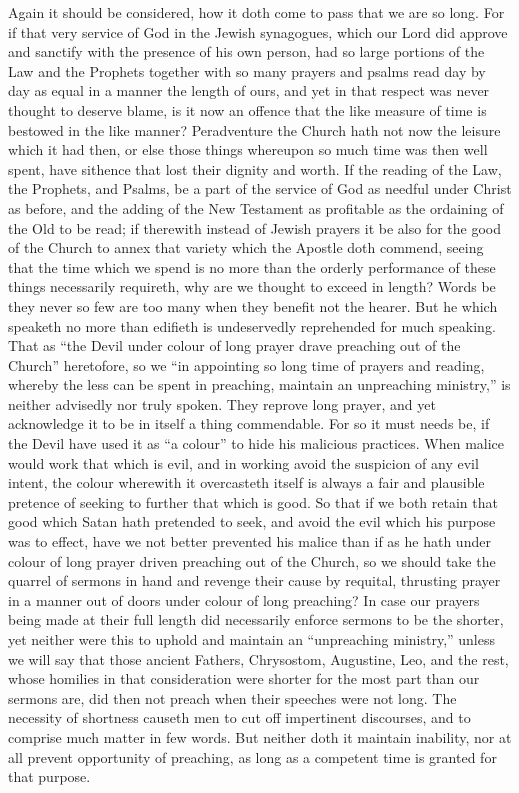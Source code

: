 Again it should be considered, how it doth come to pass  that we are so long. For if that very service of God in the Jewish synagogues, which our Lord did approve and sanctify with the presence of his own person, had so large portions of the Law and the Prophets together with so many prayers and psalms read day by day as equal in a manner the length of ours, and yet in that respect was never thought to deserve blame, is it now an offence that the like measure of time is bestowed in the like manner? Peradventure the Church hath not now the leisure which it had then, or else those things whereupon so much time was then well spent, have sithence that lost their dignity and worth. If the reading of the Law, the Prophets, and Psalms, be a part of the service of God as needful under Christ as before, and the adding of the New Testament as profitable as the ordaining of the Old to be read; if therewith instead of Jewish prayers it be also for the good of the Church to annex that variety which the Apostle doth commend, seeing that the time which we spend is no more than the orderly performance of these things necessarily requireth, why are we thought to exceed in length? Words be they never so few are too many when they benefit not the hearer. But he which speaketh no more than edifieth is undeservedly reprehended for much speaking.
That as “the Devil under colour of long prayer drave preaching out of the Church” heretofore, so we “in appointing so long time of prayers and reading, whereby the less can be spent in preaching, maintain an unpreaching ministry,” is neither advisedly nor truly spoken. They reprove long prayer, and yet acknowledge it to be in itself a thing commendable. For so it must needs be, if the Devil have used it as “a colour” to hide his malicious practices. When malice would work that which is evil, and in working avoid  the suspicion of any evil intent, the colour wherewith it overcasteth itself is always a fair and plausible pretence of seeking to further that which is good. So that if we both retain that good which Satan hath pretended to seek, and avoid the evil which his purpose was to effect, have we not better prevented his malice than if as he hath under colour of long prayer driven preaching out of the Church, so we should take the quarrel of sermons in hand and revenge their cause by requital, thrusting prayer in a manner out of doors under colour of long preaching?
In case our prayers being made at their full length did necessarily enforce sermons to be the shorter, yet neither were this to uphold and maintain an “unpreaching ministry,” unless we will say that those ancient Fathers, Chrysostom, Augustine, Leo, and the rest, whose homilies in that consideration were shorter for the most part than our sermons are, did then not preach when their speeches were not long. The necessity of shortness causeth men to cut off impertinent discourses, and to comprise much matter in few words. But neither doth it maintain inability, nor at all prevent opportunity of preaching, as long as a competent time is granted for that purpose.
